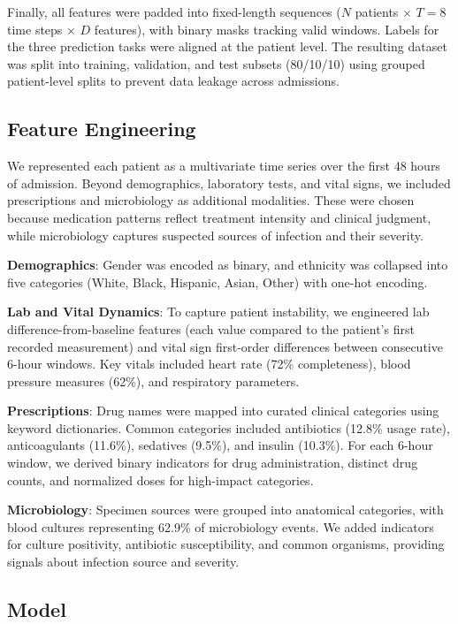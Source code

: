 \documentclass{article}
\theoremstyle{plain}
\theoremstyle{definition}
\theoremstyle{remark}
\begin{document}
Finally, all features were padded into fixed-length sequences ($N$ patients $\times$ $T{=}8$ time steps $\times$ $D$ features), with binary masks tracking valid windows. Labels for the three prediction tasks were aligned at the patient level. The resulting dataset was split into training, validation, and test subsets (80/10/10) using grouped patient-level splits to prevent data leakage across admissions.

\subsection{Feature Engineering}

We represented each patient as a multivariate time series over the first 48 hours of admission. Beyond demographics, laboratory tests, and vital signs, we included prescriptions and microbiology as additional modalities. These were chosen because medication patterns reflect treatment intensity and clinical judgment, while microbiology captures suspected sources of infection and their severity.

\textbf{Demographics}: Gender was encoded as binary, and ethnicity was collapsed into five categories (White, Black, Hispanic, Asian, Other) with one-hot encoding.

\textbf{Lab and Vital Dynamics}: To capture patient instability, we engineered lab difference-from-baseline features (each value compared to the patient's first recorded measurement) and vital sign first-order differences between consecutive 6-hour windows. Key vitals included heart rate (72\% completeness), blood pressure measures (62\%), and respiratory parameters.

\textbf{Prescriptions}: Drug names were mapped into curated clinical categories using keyword dictionaries. Common categories included antibiotics (12.8\% usage rate), anticoagulants (11.6\%), sedatives (9.5\%), and insulin (10.3\%). For each 6-hour window, we derived binary indicators for drug administration, distinct drug counts, and normalized doses for high-impact categories.

\textbf{Microbiology}: Specimen sources were grouped into anatomical categories, with blood cultures representing 62.9\% of microbiology events. We added indicators for culture positivity, antibiotic susceptibility, and common organisms, providing signals about infection source and severity.

\subsection{Model}
\end{document}
